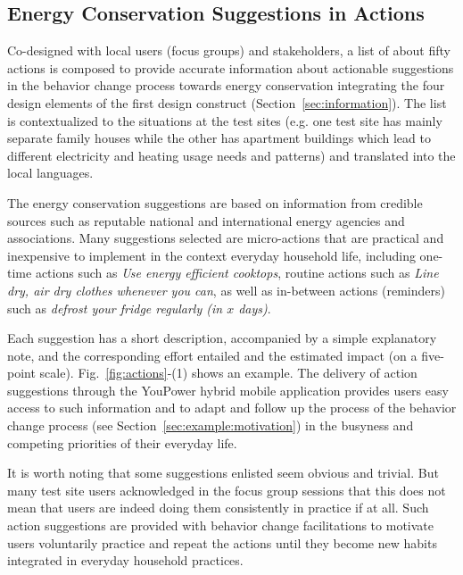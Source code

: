 \documentclass[a4paper,10pt]{article}
\begin{document}
\subsection{Energy Conservation Suggestions in Actions} 
\label{sec:example:suggestions}

Co-designed with local users (focus groups) and stakeholders, a list of about fifty actions is composed to provide accurate information about actionable suggestions in the behavior change process towards energy conservation integrating the four design elements of the first design construct (Section~\ref{sec:information}). The list is contextualized to the situations at the test sites (e.g. one test site has mainly separate family houses while the other has apartment buildings which lead to different electricity and heating usage needs and patterns) and translated into the local languages. 

The energy conservation suggestions are based on information from credible sources such as reputable national and international energy agencies and associations. Many suggestions selected are micro-actions that are practical and inexpensive to implement in the context everyday household life, including one-time actions such as \textit{Use energy efficient cooktops}, routine actions such as \textit{Line dry, air dry clothes whenever you can}, as well as in-between actions (reminders) such as \textit{defrost your fridge regularly (in $x$ days)}. 

Each suggestion has a short description, accompanied by a simple explanatory note, and the corresponding effort entailed and the estimated impact (on a five-point scale). Fig.~\ref{fig:actions}-(1) shows an example. The delivery of action suggestions through the YouPower hybrid mobile application provides users easy access to such information and to adapt and follow up the process of the behavior change process (see Section~\ref{sec:example:motivation}) in the busyness and competing priorities of their everyday life. 

It is worth noting that some suggestions enlisted seem obvious and trivial. But many test site users acknowledged in the focus group sessions that this does not mean that users are indeed doing them consistently in practice if at all. Such action suggestions are provided with behavior change facilitations to motivate users voluntarily practice and repeat the actions until  they become new habits integrated in everyday household practices. 
\end{document}
